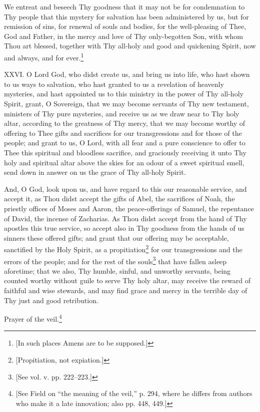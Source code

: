 We entreat and beseech Thy goodness that it may not be for condemnation to Thy people that this mystery for salvation has been administered by us, but for remission of sins, for renewal of souls and bodies, for the well-pleasing of Thee, God and Father, in the mercy and love of Thy only-begotten Son, with whom Thou art blessed, together with Thy all-holy and good and quickening Spirit, now and always, and for ever.\footnote{\par{}  [In such places Amens are to be supposed.]}

XXVI. O Lord God, who didst create us, and bring us into life, who hast shown to us ways to salvation, who hast granted to us a revelation of heavenly mysteries, and hast appointed us to this ministry in the power of Thy all-holy Spirit, grant, O Sovereign, that we may become servants of Thy new testament, ministers of Thy pure mysteries, and receive us as we draw near to Thy holy altar, according to the greatness of Thy mercy, that we may become worthy of offering to Thee gifts and sacrifices for our transgressions and for those of the people; and grant to us, O Lord, with all fear and a pure conscience to offer to Thee this spiritual and bloodless sacrifice, and graciously receiving it unto Thy holy and spiritual altar above the skies for an odour of a sweet spiritual smell, send down in answer on us the grace of Thy all-holy Spirit.

And, O God, look upon us, and have regard to this our reasonable service, and accept it, as Thou didst accept the gifts of Abel, the sacrifices of Noah, the priestly offices of Moses and Aaron, the peace-offerings of Samuel, the repentance of David, the incense of Zacharias. As Thou didst accept from the hand of Thy apostles this true service, so accept also in Thy goodness from the hands of us sinners these offered gifts; and grant that our offering may be acceptable, sanctified by the Holy Spirit, as a propitiation\footnote{\par{}  [Propitiation, not expiation.]} for our transgressions and the errors of the people; and for the rest of the souls\footnote{\par{}  [See vol. v. pp. 222–223.]} that have fallen asleep aforetime; that we also, Thy humble, sinful, and unworthy servants, being counted worthy without guile to serve Thy holy altar, may receive the reward of faithful and wise stewards, and may find grace and mercy in the terrible day of Thy just and good retribution.

Prayer of the veil.\footnote{\par{}  [See Field on “the meaning of the veil,” p. 294, where he differs from authors who make it a late innovation; also pp. 448, 449.]}


